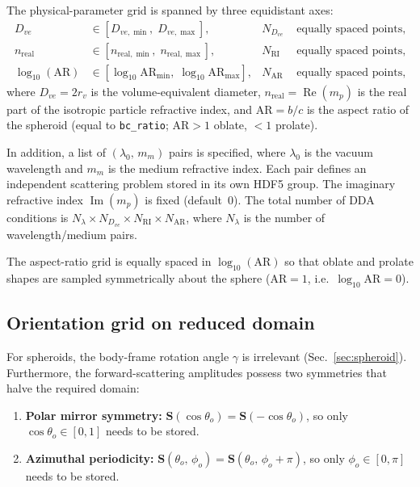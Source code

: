\documentclass[11pt,a4paper]{article}
\begin{document}
The physical-parameter grid is spanned by three equidistant axes:
\begin{align}
  D_{ve}   &\in [D_{ve,\min},\; D_{ve,\max}],
             &  N_{D_{ve}} &\text{ equally spaced points},
  \label{eq:sweep-dve} \\
  n_{\mathrm{real}}
            &\in [n_{\mathrm{real},\min},\;
                   n_{\mathrm{real},\max}],
             &  N_{\mathrm{RI}} &\text{ equally spaced points},
  \label{eq:sweep-ri} \\
  \log_{10}(\mathrm{AR})
            &\in [\log_{10}\mathrm{AR}_{\min},\;
                   \log_{10}\mathrm{AR}_{\max}],
             &  N_{\mathrm{AR}} &\text{ equally spaced points},
  \label{eq:sweep-ar}
\end{align}
where $D_{ve} = 2 r_v$ is the volume-equivalent diameter,
$n_{\mathrm{real}} = \operatorname{Re}(m_p)$ is the real part of the
isotropic particle refractive index, and
$\mathrm{AR} = b/c$ is the aspect ratio of the spheroid
(equal to \texttt{bc\_ratio}; $\mathrm{AR}>1$ oblate, $<1$ prolate).

In addition, a list of $(\lambda_0,\, m_m)$ pairs is specified,
where $\lambda_0$ is the vacuum wavelength and $m_m$ is the medium
refractive index.  Each pair defines an independent scattering problem
stored in its own HDF5 group.  The imaginary refractive index
$\operatorname{Im}(m_p)$ is fixed (default~0).  The total number of
DDA conditions is
$N_\lambda \times N_{D_{ve}} \times N_{\mathrm{RI}} \times N_{\mathrm{AR}}$,
where $N_\lambda$ is the number of wavelength/medium pairs.

The aspect-ratio grid is equally spaced in $\log_{10}(\mathrm{AR})$
so that oblate and prolate shapes are sampled symmetrically about the
sphere ($\mathrm{AR}=1$, i.e.\ $\log_{10}\mathrm{AR}=0$).

\subsection{Orientation grid on reduced domain}
\label{sec:sweep-orientation}

For spheroids, the body-frame rotation angle $\gamma$ is irrelevant
(Sec.~\ref{sec:spheroid}).  Furthermore, the forward-scattering
amplitudes possess two symmetries that halve the required domain:
\begin{enumerate}
  \item \textbf{Polar mirror symmetry:}
        $\bm{S}(\cos\theta_o) = \bm{S}(-\cos\theta_o)$,
        so only $\cos\theta_o \in [0, 1]$ needs to be stored.
  \item \textbf{Azimuthal periodicity:}
        $\bm{S}(\theta_o,\, \phi_o) = \bm{S}(\theta_o,\, \phi_o + \pi)$,
        so only $\phi_o \in [0, \pi]$ needs to be stored.
\end{enumerate}
\end{document}
